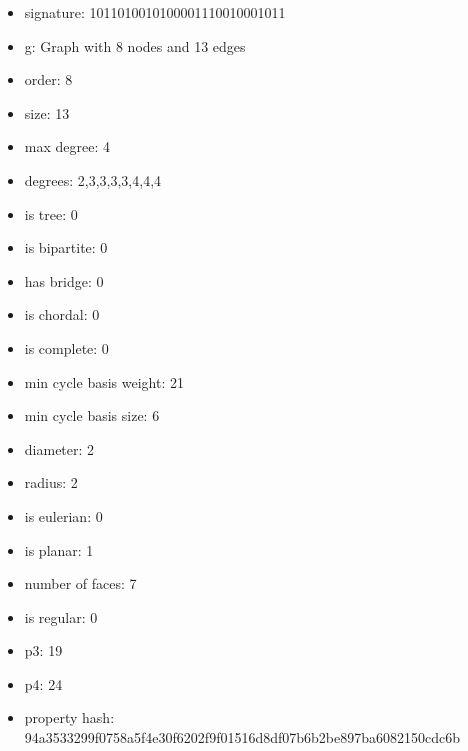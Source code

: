\begin{itemize}
\item signature: 1011010010100001110010001011
\item g: Graph with 8 nodes and 13 edges
\item order: 8
\item size: 13
\item max degree: 4
\item degrees: 2,3,3,3,3,4,4,4
\item is tree: 0
\item is bipartite: 0
\item has bridge: 0
\item is chordal: 0
\item is complete: 0
\item min cycle basis weight: 21
\item min cycle basis size: 6
\item diameter: 2
\item radius: 2
\item is eulerian: 0
\item is planar: 1
\item number of faces: 7
\item is regular: 0
\item p3: 19
\item p4: 24
\item property hash: 94a3533299f0758a5f4e30f6202f9f01516d8df07b6b2be897ba6082150cdc6b
\end{itemize}
\newpage
\begin{figure}
\end{figure}
